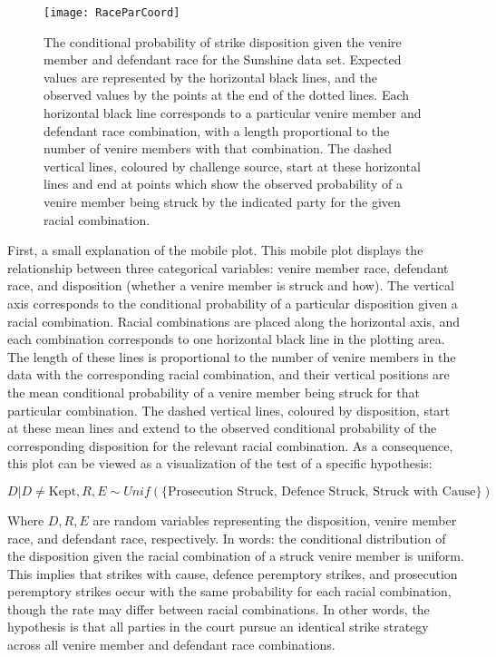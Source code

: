 \begin{figure}[!h]
  \centering
  \texttt{[image: RaceParCoord]}
  \caption[The ``Mobile Plot'' of Strikes by Racial Combination (Sunshine)]{\footnotesize The conditional probability of strike disposition given the
    venire member and defendant race for the Sunshine data set. Expected values are represented by the horizontal black lines, and the observed values
    by the points at the end of the dotted lines. Each horizontal black line corresponds to a particular venire member
    and defendant race combination, with a length proportional to the number of venire members with that combination. The dashed
    vertical lines, coloured by challenge source, start at these horizontal lines and end at points which show the observed
    probability of a venire member being struck by the indicated party for the given racial combination.}
  \label{fig:racedefmob}
\end{figure}

First, a small explanation of the mobile plot. This mobile plot displays the relationship between three categorical variables:
venire member race, defendant race, and disposition (whether a venire member is struck and how). The vertical axis corresponds
to the conditional probability of a particular disposition given a racial combination. Racial combinations
are placed along the horizontal axis, and each combination corresponds to one horizontal black line in the plotting area. The
length of these lines is proportional to the number of venire members in the data with the corresponding racial combination, and
their vertical positions are the mean conditional probability of a
venire member being struck for that particular combination. The dashed
vertical lines, coloured by disposition, start at these mean lines and
extend to the observed conditional probability of the corresponding disposition for the relevant racial combination. As a
consequence, this plot can be viewed as a visualization of the test of a specific hypothesis:

\begin{equation}
  \label{eq:vishyp}
  D | D \neq \text{Kept}, R, E \sim Unif(\{\text{Prosecution
    Struck, Defence Struck, Struck with Cause}\})
\end{equation}

Where $D, R, E$ are random variables representing the disposition, venire member race, and defendant race, respectively. In words: the conditional distribution of the
disposition given the racial combination of a struck venire member is
uniform. This implies that strikes with cause, defence peremptory
strikes, and prosecution peremptory strikes occur with the same probability for each
racial combination, though the rate may differ between racial
combinations. In other words, the hypothesis is that all parties in the court pursue an identical strike strategy across all venire member and defendant race
combinations.

